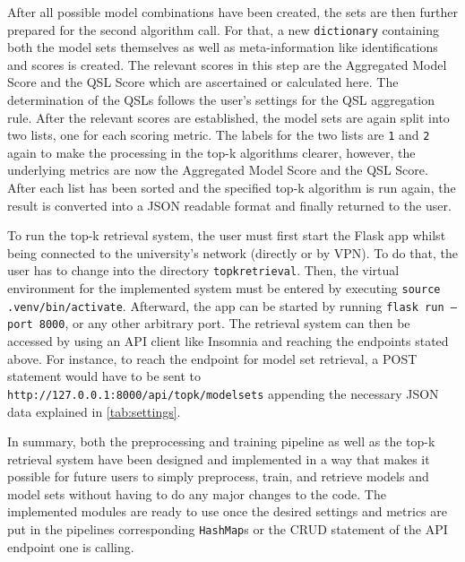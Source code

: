 After all possible model combinations have been created, the sets are then further prepared for the second algorithm call. For that, a new \texttt{dictionary} containing both the model sets themselves as well as meta-information like identifications and scores is created. The relevant scores in this step are the Aggregated Model Score and the QSL Score which are ascertained or calculated here. The determination of the QSLs follows the user's settings for the QSL aggregation rule. After the relevant scores are established, the model sets are again split into two lists, one for each scoring metric. The labels for the two lists are \texttt{1} and \texttt{2} again to make the processing in the top-k algorithms clearer, however, the underlying metrics are now the Aggregated Model Score and the QSL Score. After each list has been sorted and the specified top-k algorithm is run again, the result is converted into a JSON readable format and finally returned to the user.


To run the top-k retrieval system, the user must first start the Flask app whilst being connected to the university's network (directly or by VPN). To do that, the user has to change into the directory \texttt{topkretrieval}. Then, the virtual environment for the implemented system must be entered by executing \texttt{source .venv/bin/activate}. Afterward, the app can be started by running \texttt{flask run --port 8000}, or any other arbitrary port. The retrieval system can then be accessed by using an API client like Insomnia and reaching the endpoints stated above. For instance, to reach the endpoint for model set retrieval, a POST statement would have to be sent to \texttt{http://127.0.0.1:8000/api/topk/modelsets} appending the necessary JSON data explained in \autoref{tab:settings}.

In summary, both the preprocessing and training pipeline as well as the top-k retrieval system have been designed and implemented in a way that makes it possible for future users to simply preprocess, train, and retrieve models and model sets without having to do any major changes to the code. The implemented modules are ready to use once the desired settings and metrics are put in the pipelines corresponding \texttt{HashMap}s or the CRUD statement of the API endpoint one is calling.




